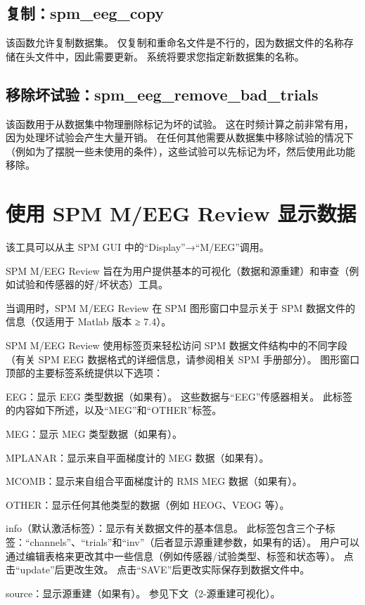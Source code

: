 \subsection{复制：spm\_eeg\_copy}

该函数允许复制数据集。
仅复制和重命名文件是不行的，因为数据文件的名称存储在头文件中，因此需要更新。
系统将要求您指定新数据集的名称。


\subsection{移除坏试验：spm\_eeg\_remove\_bad\_trials}

该函数用于从数据集中物理删除标记为坏的试验。
这在时频计算之前非常有用，因为处理坏试验会产生大量开销。
在任何其他需要从数据集中移除试验的情况下（例如为了摆脱一些未使用的条件），这些试验可以先标记为坏，然后使用此功能移除。


\section{使用 SPM M/EEG Review 显示数据}

该工具可以从主 SPM GUI 中的“Display”→“M/EEG”调用。

SPM M/EEG Review 旨在为用户提供基本的可视化（数据和源重建）和审查（例如试验和传感器的好/坏状态）工具。

当调用时，SPM M/EEG Review 在 SPM 图形窗口中显示关于 SPM 数据文件的信息（仅适用于 Matlab 版本 ≥ 7.4）。

SPM M/EEG Review 使用标签页来轻松访问 SPM 数据文件结构中的不同字段（有关 SPM EEG 数据格式的详细信息，请参阅相关 SPM 手册部分）。
图形窗口顶部的主要标签系统提供以下选项：

EEG：显示 EEG 类型数据（如果有）。
这些数据与“EEG”传感器相关。
此标签的内容如下所述，以及“MEG”和“OTHER”标签。

MEG：显示 MEG 类型数据（如果有）。

MPLANAR：显示来自平面梯度计的 MEG 数据（如果有）。

MCOMB：显示来自组合平面梯度计的 RMS MEG 数据（如果有）。

OTHER：显示任何其他类型的数据（例如 HEOG、VEOG 等）。

info（默认激活标签）：显示有关数据文件的基本信息。
此标签包含三个子标签：“channels”、“trials”和“inv”（后者显示源重建参数，如果有的话）。
用户可以通过编辑表格来更改其中一些信息（例如传感器/试验类型、标签和状态等）。
点击“update”后更改生效。
点击“SAVE”后更改实际保存到数据文件中。

source：显示源重建（如果有）。
参见下文（2-源重建可视化）。

